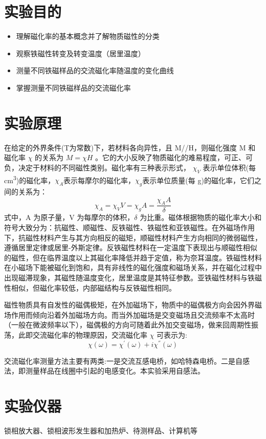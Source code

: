 \documentclass[a4paper,utf8]{article}
\begin{document}
\section{实验目的}
    \begin{itemize}
        \item 理解磁化率的基本概念并了解物质磁性的分类 
        \item 观察铁磁性转变及转变温度（居里温度）
        \item 测量不同铁磁样品的交流磁化率随温度的变化曲线
        \item 掌握测量不同铁磁样品的交流磁化率
    \end{itemize}
\section{实验原理}
    在给定的外界条件(T为常数)下，若材料各向异性，且 M//H，则磁化强度 M 和磁化率 $\chi$ 的关系为 $M=\chi H$ 。它的大小反映了物质磁化的难易程度，可正、可负，决定于材料的不同磁性类别。磁化率有三种表示形式， $\chi_V$ 表示单位体积(每 \unit{\cm^3})的磁化率，$\chi_A$表示每摩尔的磁化率，$\chi_g$表示单位质量(每 g)的磁化率，它们之间的关系为：
    \begin{equation}
        \chi_{A}=\chi_{V}V=\chi_{g}A=\frac{\chi_{A}A}{\delta}
    \end{equation}
    式中，A 为原子量，V 为每摩尔的体积，$\delta$ 为比重。磁体根据物质的磁化率大小和符号大致分为：抗磁性、顺磁性、反铁磁性、铁磁性和亚铁磁性。在外磁场作用下，抗磁性材料产生与其方向相反的磁矩，顺磁性材料产生方向相同的微弱磁性，遵循居里定律或居里-外斯定律。反铁磁性材料在一定温度下表现出与顺磁性相似的磁性，但在临界温度以上其磁化率降低并趋于定值，称为奈耳温度。铁磁性材料在小磁场下能被磁化到饱和，具有非线性的磁化强度和磁场关系，并在磁化过程中出现磁滞现象，其磁性随温度变化，居里温度是其特征参数。亚铁磁性材料与铁磁性相似，但磁化率较低，内部磁结构与反铁磁性相同。\par
    磁性物质具有自发性的磁偶极矩，在外加磁场下，物质中的磁偶极方向会因外界磁场作用而倾向沿着外加磁场方向。而当外加磁场是交变磁场且交流频率不太高时（一般在微波频率以下），磁偶极的方向可随着此外加交变磁场，做来回周期性振荡，此即交流磁化率的物理原因，交流磁化率 $\chi$ 可表示为:
    \begin{equation}
        \chi(\omega)=\chi^{'}(\omega)+i\chi^{''}(\omega)
    \end{equation}\par
    交流磁化率测量方法主要有两类:一是交流互感电桥，如哈特森电桥。二是自感法，即测量样品在线圈中引起的电感变化。本实验采用自感法。
\section{实验仪器}
    锁相放大器、锁相波形发生器和加热炉、待测样品、计算机等
\end{document}
